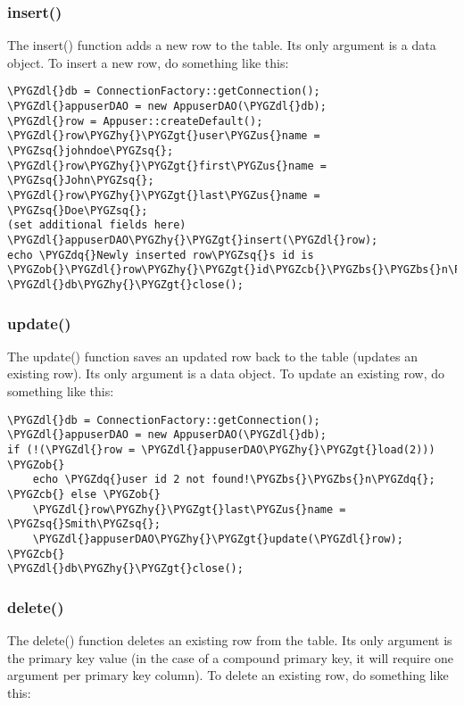 \documentclass[letterpaper,10pt,english]{sphinxmanual}
\def\PYGZbs{\char`\\}
\def\PYGZus{\char`\_}
\def\PYGZob{\char`\{}
\def\PYGZcb{\char`\}}
\def\PYGZgt{\char`\>}
\def\PYGZdl{\char`\$}
\def\PYGZhy{\char`\-}
\def\PYGZsq{\char`\'}
\def\PYGZdq{\char`\"}
\renewcommand\PYGZsq{\textquotesingle}
\begin{document}
\subsubsection{insert()}
\label{jaxFrameworkGuide:insert}
The insert() function adds a new row to the table.  Its only argument is a data object.  To insert a
new row, do something like this:

\begin{Verbatim}[commandchars=\\\{\}]
\PYGZdl{}db = ConnectionFactory::getConnection();
\PYGZdl{}appuserDAO = new AppuserDAO(\PYGZdl{}db);
\PYGZdl{}row = Appuser::createDefault();
\PYGZdl{}row\PYGZhy{}\PYGZgt{}user\PYGZus{}name = \PYGZsq{}johndoe\PYGZsq{};
\PYGZdl{}row\PYGZhy{}\PYGZgt{}first\PYGZus{}name = \PYGZsq{}John\PYGZsq{};
\PYGZdl{}row\PYGZhy{}\PYGZgt{}last\PYGZus{}name = \PYGZsq{}Doe\PYGZsq{};
(set additional fields here)
\PYGZdl{}appuserDAO\PYGZhy{}\PYGZgt{}insert(\PYGZdl{}row);
echo \PYGZdq{}Newly inserted row\PYGZsq{}s id is \PYGZob{}\PYGZdl{}row\PYGZhy{}\PYGZgt{}id\PYGZcb{}\PYGZbs{}\PYGZbs{}n\PYGZdq{};
\PYGZdl{}db\PYGZhy{}\PYGZgt{}close();
\end{Verbatim}


\subsubsection{update()}
\label{jaxFrameworkGuide:update}
The update() function saves an updated row back to the table (updates an existing row).  Its only
argument is a data object.  To update an existing row, do something like this:

\begin{Verbatim}[commandchars=\\\{\}]
\PYGZdl{}db = ConnectionFactory::getConnection();
\PYGZdl{}appuserDAO = new AppuserDAO(\PYGZdl{}db);
if (!(\PYGZdl{}row = \PYGZdl{}appuserDAO\PYGZhy{}\PYGZgt{}load(2))) \PYGZob{}
    echo \PYGZdq{}user id 2 not found!\PYGZbs{}\PYGZbs{}n\PYGZdq{};
\PYGZcb{} else \PYGZob{}
    \PYGZdl{}row\PYGZhy{}\PYGZgt{}last\PYGZus{}name = \PYGZsq{}Smith\PYGZsq{};
    \PYGZdl{}appuserDAO\PYGZhy{}\PYGZgt{}update(\PYGZdl{}row);
\PYGZcb{}
\PYGZdl{}db\PYGZhy{}\PYGZgt{}close();
\end{Verbatim}


\subsubsection{delete()}
\label{jaxFrameworkGuide:delete}
The delete() function deletes an existing row from the table.  Its only argument is the primary key
value (in the case of a compound primary key, it will require one argument per primary key column).
To delete an existing row, do something like this:
\end{document}

